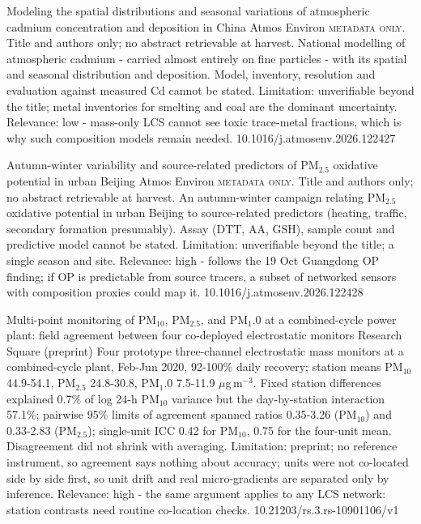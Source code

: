 \documentclass[10pt]{article}
\begin{document}
{Modeling the spatial distributions and seasonal variations of atmospheric cadmium concentration and deposition in China}
{Atmos Environ}
{\textsc{metadata only.} Title and authors only; no abstract retrievable at harvest. National modelling of atmospheric cadmium - carried almost entirely on fine particles - with its spatial and seasonal distribution and deposition. Model, inventory, resolution and evaluation against measured Cd cannot be stated. Limitation: unverifiable beyond the title; metal inventories for smelting and coal are the dominant uncertainty. Relevance: low - mass-only LCS cannot see toxic trace-metal fractions, which is why such composition models remain needed.}
{10.1016/j.atmosenv.2026.122427}

{Autumn-winter variability and source-related predictors of PM$_{2.5}$ oxidative potential in urban Beijing}
{Atmos Environ}
{\textsc{metadata only.} Title and authors only; no abstract retrievable at harvest. An autumn-winter campaign relating PM$_{2.5}$ oxidative potential in urban Beijing to source-related predictors (heating, traffic, secondary formation presumably). Assay (DTT, AA, GSH), sample count and predictive model cannot be stated. Limitation: unverifiable beyond the title; a single season and site. Relevance: high - follows the 19 Oct Guangdong OP finding; if OP is predictable from source tracers, a subset of networked sensors with composition proxies could map it.}
{10.1016/j.atmosenv.2026.122428}

\par{}\baselineskip{}\baselineskip
{}

{Multi-point monitoring of PM$_{10}$, PM$_{2.5}$, and PM$_{1}$.0 at a combined-cycle power plant: field agreement between four co-deployed electrostatic monitors}
{Research Square (preprint)}
{Four prototype three-channel electrostatic mass monitors at a combined-cycle plant, Feb-Jun 2020, 92-100\% daily recovery; station means PM$_{10}$ 44.9-54.1, PM$_{2.5}$ 24.8-30.8, PM$_{1}$.0 7.5-11.9 $\mu$g\,m$^{-3}$. Fixed station differences explained 0.7\% of log 24-h PM$_{10}$ variance but the day-by-station interaction 57.1\%; pairwise 95\% limits of agreement spanned ratios 0.35-3.26 (PM$_{10}$) and 0.33-2.83 (PM$_{2.5}$); single-unit ICC 0.42 for PM$_{10}$, 0.75 for the four-unit mean. Disagreement did not shrink with averaging. Limitation: preprint; no reference instrument, so agreement says nothing about accuracy; units were not co-located side by side first, so unit drift and real micro-gradients are separated only by inference. Relevance: high - the same argument applies to any LCS network: station contrasts need routine co-location checks.}
{10.21203/rs.3.rs-10901106/v1}
\end{document}
